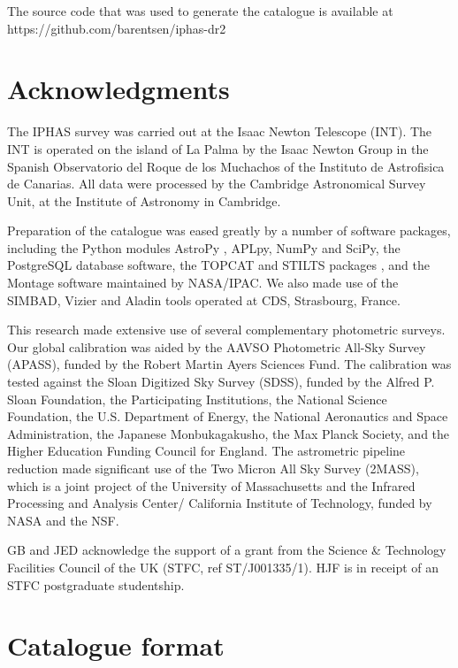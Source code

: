 \documentclass[useAMS,usenatbib]{mn2e}
\begin{document}
The source code that was used to generate
the catalogue is available at
https://github.com/barentsen/iphas-dr2

\section*{Acknowledgments}

The IPHAS survey was carried out 
at the Isaac Newton Telescope (INT).
The INT is operated on the island of La Palma
by the Isaac Newton Group
in the Spanish Observatorio del Roque de los Muchachos
of the Instituto de Astrofisica de Canarias.
All data were processed 
by the Cambridge Astronomical Survey Unit,
at the Institute of Astronomy in Cambridge.

Preparation of the catalogue was eased greatly
by a number of software packages,
including the Python modules
AstroPy \citep{Astropy},
APLpy, NumPy and SciPy,
the PostgreSQL database software,
the TOPCAT and STILTS packages \citep{Taylor2005,Taylor2006},
and the Montage software maintained by NASA/IPAC.
We also made use of the SIMBAD, Vizier and Aladin \citep{Aladin} tools operated at CDS, Strasbourg, France.

This research made extensive use of
several complementary photometric surveys.
Our global calibration was aided
by the AAVSO Photometric All-Sky Survey (APASS),
funded by the Robert Martin Ayers Sciences Fund.
The calibration was tested against the
Sloan Digitized Sky Survey (SDSS),
funded by the Alfred P. Sloan Foundation, the Participating Institutions, the National Science Foundation, the U.S. Department of Energy, the National Aeronautics and Space Administration, the Japanese Monbukagakusho, the Max Planck Society, and the Higher Education Funding Council for England.
The astrometric pipeline reduction made
significant use of the Two Micron All Sky Survey (2MASS),
which is a joint project 
of the University of Massachusetts
and the Infrared Processing and Analysis Center/
California Institute of Technology,
funded by NASA and the NSF.

GB and JED acknowledge the support of a grant
from the Science \& Technology Facilities Council
of the UK (STFC, ref ST/J001335/1).
HJF is in receipt of an STFC postgraduate studentship.




\appendix
\onecolumn
\section{Catalogue format}
\label{app:columns}
\end{document}
